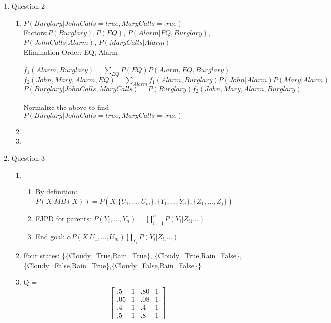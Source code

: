 \documentclass[11pt]{article}
\begin{document}
\begin{enumerate}
\begin{enumerate}
\end{enumerate}

\item Question 2
\begin{enumerate}
\item $P(Burglary|JohnCalls = true, MaryCalls = true)$
\\Factors:$ P(Burglary), P(EQ)$, $P(Alarm|EQ, Burglary)$,$ P(JohnCalls|Alarm)$, $P(MaryCalls|Alarm)$
\\Elimination Order: EQ, Alarm
\\
\\$f_{1}(Alarm, Burglary) = \sum_{EQ} P(EQ) P(Alarm, EQ, Burglary)$
\\$f_{2}(John, Mary, Alarm, EQ) = \sum_{Alarm}f_{1}(Alarm,Burglary)P(John|Alarm)P(Mary|Alarm)$
\\$P(Burglary|JohnCalls,MaryCalls) = P(Burglary)f_{2}(John, Mary, Alarm, Burglary)$
\\
\\Normalize the above to find $P(Burglary|JohnCalls = true, MaryCalls = true)$
\item
\item
\end {enumerate}

\item Question 3
\begin{enumerate}
\item
\begin{enumerate}
\item By definition: $P(X|MB(X)) = P(X|\{U_1, ..., U_m\}, \{Y_1, ..., Y_n\}, \{Z_1, ..., Z_j\}) $
\item FJPD for parents: $P(Y_i, ..., Y_n) = \prod_{i=1}^{n} P(Y_i | Z_{i1}...)$ 
\item End goal: $\alpha P(X|U_1, ..., U_m) \prod_{Y_i} P(Y_i | Z_{i1} ...)$
\end{enumerate}
\item Four states: \{\{Cloudy=True,Rain=True\}, \{Cloudy=True,Rain=False\}, \\
 \{Cloudy=False,Rain=True\},\{Cloudy=False,Rain=False\}\}
\item Q = \[
\begin{bmatrix}
	.5 & 1 & .80 & 1 \\
	.05 & 1 & .08 & 1 \\
	.4 & 1 & .4 & 1 \\
	.5 & 1 & .8 & 1
\end{bmatrix}
\]
\end{enumerate}


\end{enumerate}
\end{document}
